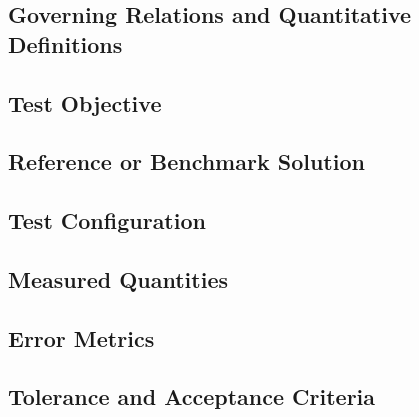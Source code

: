 \subsection{Governing Relations and Quantitative Definitions}
\label{sec:res-ver-tst-governing-relations}

%

\subsection{Test Objective}
\label{sec:res-ver-tst-test-objective}


\subsection{Reference or Benchmark Solution}
\label{sec:res-ver-tst-reference-benchmark-solution}


\subsection{Test Configuration}
\label{sec:res-ver-tst-test-configuration}


\subsection{Measured Quantities}
\label{sec:res-ver-tst-measured-quantities}


\subsection{Error Metrics}
\label{sec:res-ver-tst-error-metrics}


\subsection{Tolerance and Acceptance Criteria}
\label{sec:res-ver-tst-tolerance-acceptance-criteria}

